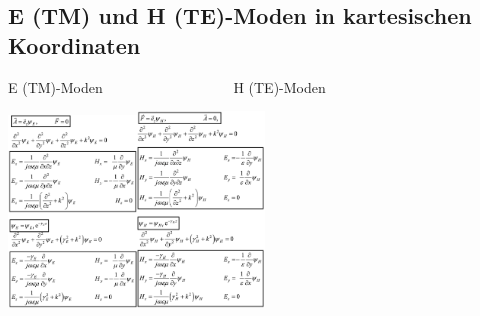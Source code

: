 \documentclass[english]{latex4ei/latex4ei_sheet}
\begin{document}
\begin{sectionbox}
    \subsection{E (TM) und H (TE)-Moden in kartesischen Koordinaten}
    E (TM)-Moden$\quad\quad\quad\quad\quad\quad\quad\quad\quad$ H (TE)-Moden
    \begin{center}\includegraphics[width = 3.4cm]{./img/TM-kartesisch.png}\includegraphics[width = 3.4cm]{./img/TE-kartesisch.png}\end{center}
\end{sectionbox}

\end{document}
